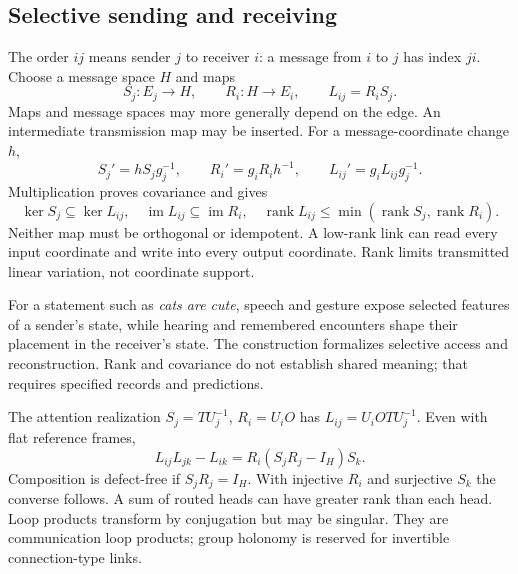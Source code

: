 \subsection{Selective sending and receiving}\label{sec:matrix_communication}
The order $ij$ means sender $j$ to receiver $i$: a message from $i$ to $j$ has index $ji$. Choose a message space $H$ and maps
\begin{equation}
S_j:E_j\longrightarrow H,\qquad R_i:H\longrightarrow E_i,\qquad L_{ij}=R_iS_j.
\label{eq:selective_link}
\end{equation}
Maps and message spaces may more generally depend on the edge. An intermediate transmission map may be inserted. For a message-coordinate change $h$,
\begin{equation}
S_j'=hS_jg_j^{-1},\qquad R_i'=g_iR_i h^{-1},\qquad
L_{ij}'=g_iL_{ij}g_j^{-1}.
\label{eq:matrix_link_covariance}
\end{equation}
Multiplication proves covariance and gives
\begin{equation}
\ker S_j\subseteq\ker L_{ij},\quad
\operatorname{im}L_{ij}\subseteq\operatorname{im}R_i,\quad
\operatorname{rank}L_{ij}\leq\min(\operatorname{rank}S_j,\operatorname{rank}R_i).
\label{eq:selective_rank}
\end{equation}
Neither map must be orthogonal or idempotent. A low-rank link can read every input coordinate and write into every output coordinate. Rank limits transmitted linear variation, not coordinate support.

For a statement such as \emph{cats are cute}, speech and gesture expose selected features of a sender's state, while hearing and remembered encounters shape their placement in the receiver's state. The construction formalizes selective access and reconstruction. Rank and covariance do not establish shared meaning; that requires specified records and predictions.

The attention realization $S_j=TU_j^{-1}$, $R_i=U_iO$ has $L_{ij}=U_iOTU_j^{-1}$. Even with flat reference frames,
\begin{equation}
L_{ij}L_{jk}-L_{ik}=R_i(S_jR_j-I_H)S_k.
\label{eq:matrix_composition_defect}
\end{equation}
Composition is defect-free if $S_jR_j=I_H$. With injective $R_i$ and surjective $S_k$ the converse follows. A sum of routed heads can have greater rank than each head. Loop products transform by conjugation but may be singular. They are communication loop products; group holonomy is reserved for invertible connection-type links.

